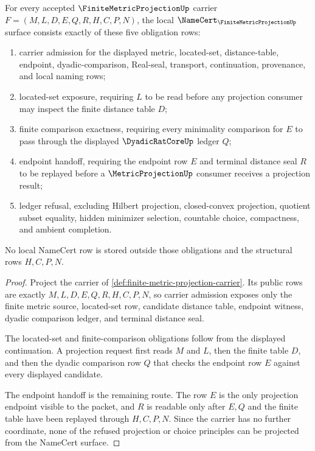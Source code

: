 \begin{theorem}
\label{thm:finite-metric-projection-namecert-obligations}
For every accepted $\FiniteMetricProjectionUp$ carrier $F=(M,L,D,E,Q,R,H,C,P,N)$, the local $\NameCert_{\FiniteMetricProjectionUp}$ surface consists exactly of these five obligation rows:
\begin{enumerate}
\item carrier admission for the displayed metric, located-set, distance-table, endpoint, dyadic-comparison, Real-seal, transport, continuation, provenance, and local naming rows;
\item located-set exposure, requiring $L$ to be read before any projection consumer may inspect the finite distance table $D$;
\item finite comparison exactness, requiring every minimality comparison for $E$ to pass through the displayed $\DyadicRatCoreUp$ ledger $Q$;
\item endpoint handoff, requiring the endpoint row $E$ and terminal distance seal $R$ to be replayed before a $\MetricProjectionUp$ consumer receives a projection result;
\item ledger refusal, excluding Hilbert projection, closed-convex projection, quotient subset equality, hidden minimizer selection, countable choice, compactness, and ambient completion.
\end{enumerate}
No local NameCert row is stored outside those obligations and the structural rows $H,C,P,N$.
\end{theorem}
\begin{proof}
Project the carrier of \autoref{def:finite-metric-projection-carrier}. Its public rows are exactly $M,L,D,E,Q,R,H,C,P,N$, so carrier admission exposes only the finite metric source, located-set row, candidate distance table, endpoint witness, dyadic comparison ledger, and terminal distance seal.

The located-set and finite-comparison obligations follow from the displayed continuation. A projection request first reads $M$ and $L$, then the finite table $D$, and then the dyadic comparison row $Q$ that checks the endpoint row $E$ against every displayed candidate.

The endpoint handoff is the remaining route. The row $E$ is the only projection endpoint visible to the packet, and $R$ is readable only after $E,Q$ and the finite table have been replayed through $H,C,P,N$. Since the carrier has no further coordinate, none of the refused projection or choice principles can be projected from the NameCert surface.
\end{proof}

